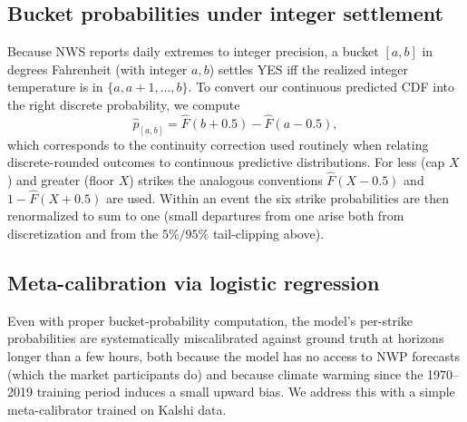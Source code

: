 \documentclass[11pt]{article}
\begin{document}
\subsection{Bucket probabilities under integer settlement}

Because NWS reports daily extremes to integer precision, a bucket
$[a, b]$ in degrees Fahrenheit (with integer $a, b$) settles YES iff the
realized integer temperature is in $\{a, a+1, \ldots, b\}$. To convert our
continuous predicted CDF into the right discrete probability, we compute
\begin{equation}
\hat{p}_{[a,b]} = \hat{F}(b + 0.5) - \hat{F}(a - 0.5),
\label{eq:bucket-prob}
\end{equation}
which corresponds to the continuity correction used routinely when relating
discrete-rounded outcomes to continuous predictive distributions. For
\textsf{less} (cap $X$) and \textsf{greater} (floor $X$) strikes the
analogous conventions $\hat{F}(X - 0.5)$ and $1 - \hat{F}(X + 0.5)$ are
used. Within an event the six strike probabilities are then renormalized
to sum to one (small departures from one arise both from discretization
and from the $5\%/95\%$ tail-clipping above).

\subsection{Meta-calibration via logistic regression}

Even with proper bucket-probability computation, the model's per-strike
probabilities are systematically miscalibrated against ground truth at
horizons longer than a few hours, both because the model has no access to
NWP forecasts (which the market participants do) and because climate
warming since the 1970--2019 training period induces a small upward bias.
We address this with a simple meta-calibrator trained on Kalshi data.
\end{document}

